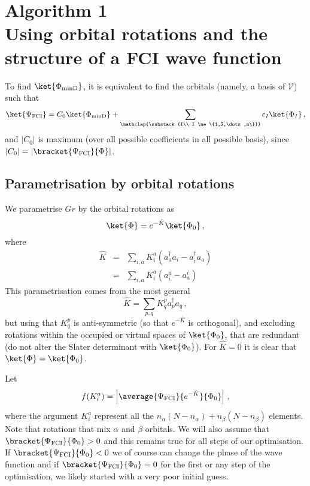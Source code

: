 \documentclass[a4paper,11pt]{article}
\begin{document}
\newpage
\section{\textsf{\LARGE Algorithm 1}\\Using orbital rotations and the structure of a FCI wave function}

To find $\ket{\Phi_\text{minD}}$, it is equivalent to find the orbitals (namely, a basis of $\mathcal{V}$) such that 
\begin{equation}
  \ket{\Psi_\text{FCI}} = C_0 \ket{\Phi_\text{minD}} +
  \sum_{
    \mathclap{\substack{I\\
        I \ne \{1,2,\dots,n\}}}
      }
    c_I \ket{\Phi_I}\,,
\end{equation}
and $|C_0|$ is maximum (over all possible coefficients in all possible basis), since $|C_0| = |\bracket{\Psi_\text{FCI}}{\Phi}|$.

\subsection{Parametrisation by orbital rotations}
We parametrise $Gr$ by the orbital rotations as\cite{}
\begin{equation}
  \ket{\Phi} = e^{-\hat{K}} \ket{\Phi_0}\,,
\end{equation}
where
\begin{eqnarray}
  \hat{K} &=& \sum_{i,a} K_i^a(a_a^\dagger a_i - a_i^\dagger a_a)\\
          &=& \sum_{i,a} K_i^a(a_i^a - a_a^i)\,
\end{eqnarray}
This parametrisation comes from the most general 
\begin{equation}
  \hat{K} = \sum_{p,q} K_q^pa_p^\dagger a_q\,,
\end{equation}
but using that $K_q^p$ is anti-symmetric (so that $e^{-\hat{K}}$ is orthogonal), and excluding rotations within the occupied or virtual spaces of $\ket{\Phi_0}$, that are redundant (do not alter the Slater determinant with $\ket{\Phi_0}$).
For $\hat{K} = 0$ it is clear that $\ket{\Phi} = \ket{\Phi_0}$.

Let
\begin{equation}
  f(K_i^a) = \left|\average{\Psi_\text{FCI}}{e^{-\hat{K}}}{\Phi_0}\right|\,,
\end{equation}
where the argument $K_i^a$ represent all the $n_\alpha(N-n_\alpha) + n_\beta(N-n_\beta)$ elements.
Note that rotations that mix $\alpha$ and $\beta$ orbitals.
We will also assume that $\bracket{\Psi_\text{FCI}}{\Phi_0} > 0$ and this remains true for all steps
of our optimisation.
If $\bracket{\Psi_\text{FCI}}{\Phi_0} < 0$ we of course can change the phase of the wave function and
if $\bracket{\Psi_\text{FCI}}{\Phi_0} = 0$ for the first or any step of the optimisation, we likely started with a very poor initial guess.
\end{document}
